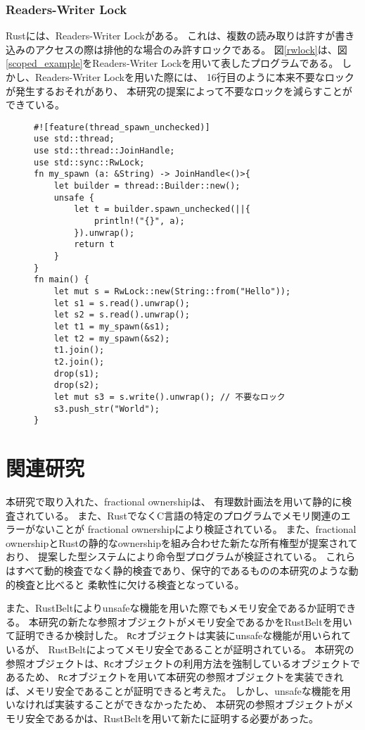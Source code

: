 \documentclass{sumiilab-paper}
\theoremstyle{mystyle}
\numberwithin{definition}{chapter} %
\begin{document}
\subsection{Readers-Writer Lock}
Rustには、Readers-Writer Lock\cite{DBLP:journals/cacm/CouroisHP71}がある。
これは、複数の読み取りは許すが書き込みのアクセスの際は排他的な場合のみ許すロックである。
図\ref{rwlock}は、図\ref{scoped_example}をReaders-Writer Lockを用いて表したプログラムである。
しかし、Readers-Writer Lockを用いた際には、
16行目のように本来不要なロックが発生するおそれがあり、
本研究の提案によって不要なロックを減らすことができている。
\begin{figure}[htp]
\begin{lstlisting}[caption=Readers-Writer Lockを用いた並列処理の例, 
  label=rwlock, captionpos=b]
#![feature(thread_spawn_unchecked)]
use std::thread;
use std::thread::JoinHandle;
use std::sync::RwLock;
fn my_spawn (a: &String) -> JoinHandle<()>{
    let builder = thread::Builder::new();
    unsafe {
        let t = builder.spawn_unchecked(||{
            println!("{}", a);
        }).unwrap();
        return t
    }
}
fn main() {
    let mut s = RwLock::new(String::from("Hello"));
    let s1 = s.read().unwrap();
    let s2 = s.read().unwrap();
    let t1 = my_spawn(&s1);
    let t2 = my_spawn(&s2); 
    t1.join();
    t2.join();
    drop(s1);
    drop(s2);
    let mut s3 = s.write().unwrap(); // 不要なロック
    s3.push_str("World");
}
\end{lstlisting}
\end{figure}

\chapter{関連研究}
本研究で取り入れた、fractional ownership\cite{DBLP:conf/sas/Boyland03}は、
有理数計画法を用いて静的に検査されている。
また、RustでなくC言語の特定のプログラムでメモリ関連のエラーがないことが
fractional ownershipにより検証されている\cite{10.1007/978-3-642-10672-9_11}。
また、fractional ownershipとRustの静的なownershipを組み合わせた新たな所有権型が提案されており、
提案した型システムにより命令型プログラムが検証されている\cite{10.1007/978-3-031-50521-8_11}。
これらはすべて動的検査でなく静的検査であり、保守的であるものの本研究のような動的検査と比べると
柔軟性に欠ける検査となっている。

また、RustBelt\cite{DBLP:journals/pacmpl/0002JKD18}によりunsafeな機能を用いた際でもメモリ安全であるか証明できる。
本研究の新たな参照オブジェクトがメモリ安全であるかをRustBeltを用いて証明できるか検討した。
\texttt{Rc}オブジェクトは実装にunsafeな機能が用いられているが、
RustBeltによってメモリ安全であることが証明されている。
本研究の参照オブジェクトは、\texttt{Rc}オブジェクトの利用方法を強制しているオブジェクトであるため、
\texttt{Rc}オブジェクトを用いて本研究の参照オブジェクトを実装できれば、メモリ安全であることが証明できると考えた。
しかし、unsafeな機能を用いなければ実装することができなかったため、
本研究の参照オブジェクトがメモリ安全であるかは、RustBeltを用いて新たに証明する必要があった。
\end{document}
